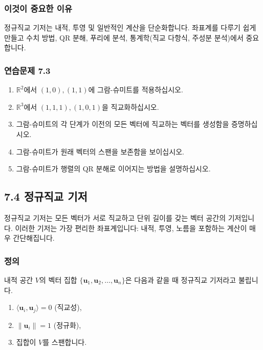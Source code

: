 \documentclass[
  12pt,
  a4paper,
]{article}
\begin{document}
\subsubsection{이것이 중요한 이유}\label{why-this-matters-26}

정규직교 기저는 내적, 투영 및 일반적인 계산을 단순화합니다. 좌표계를 다루기 쉽게 만들고 수치 방법, QR 분해, 푸리에 분석, 통계학(직교 다항식, 주성분 분석)에서 중요합니다.

\subsubsection{연습문제 7.3}\label{exercises-73}

\begin{enumerate}
\def\labelenumi{\arabic{enumi}.}
\item
  \(\mathbb{R}^2\)에서 \((1,0), (1,1)\)에 그람-슈미트를 적용하십시오.
\item
  \(\mathbb{R}^3\)에서 \((1,1,1), (1,0,1)\)을 직교화하십시오.
\item
  그람-슈미트의 각 단계가 이전의 모든 벡터에 직교하는 벡터를 생성함을 증명하십시오.
\item
  그람-슈미트가 원래 벡터의 스팬을 보존함을 보이십시오.
\item
  그람-슈미트가 행렬의 QR 분해로 이어지는 방법을 설명하십시오.
\end{enumerate}

\subsection{7.4 정규직교 기저}\label{74-orthonormal-bases}

정규직교 기저는 모든 벡터가 서로 직교하고 단위 길이를 갖는 벡터 공간의 기저입니다. 이러한 기저는 가장 편리한 좌표계입니다: 내적, 투영, 노름을 포함하는 계산이 매우 간단해집니다.

\subsubsection{정의}\label{definition-4}

내적 공간 \(V\)의 벡터 집합 \(\{\mathbf{u}_1, \mathbf{u}_2, \dots, \mathbf{u}_n\}\)은 다음과 같을 때 정규직교 기저라고 불립니다.

\begin{enumerate}
\def\labelenumi{\arabic{enumi}.}
\item
  \(\langle \mathbf{u}_i, \mathbf{u}_j \rangle = 0\) (직교성),
\item
  \(\|\mathbf{u}_i\| = 1\) (정규화),
\item
  집합이 \(V\)를 스팬합니다.
\end{enumerate}
\end{document}
